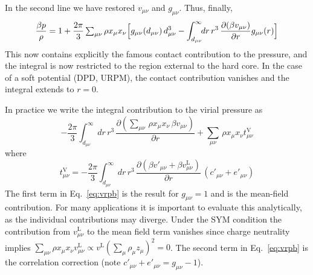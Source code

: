 \documentclass[12pt,a4paper]{article}
\newcommand{\lr}{^{\mathrm{L}}}
\newcommand{\Eqref}[1]{Eq.~\eqref{#1}}
\begin{document}
%
In the second line we have restored $v_{\mu\nu}$ and $g_{\mu\nu}$. 
Thus, finally,
%
\begin{equation}
\frac{\beta p}{\rho}=1
+\frac{2\pi}{3}\,{\textstyle \sum_{\mu\nu}}\,\rho x_\mu x_\nu 
\Bigl[g_{\mu\nu}(d_{\mu\nu})\,d_{\mu\nu}^3 
- \int_{d_{\mu\nu}}^\infty\!\!dr\,r^3\,\frac{\partial(\beta
  v_{\mu\nu})}{\partial r} g_{\mu\nu}(r)\Bigr]
\end{equation}
%
This now contains explicitly the famous contact contribution to the
pressure, and the integral is now restricted to the region external to
the hard core.  In the case of a soft potential (DPD, URPM), the
contact contribution vanishes and the integral extends to $r=0$.

In practice we write the integral contribution to the virial pressure as
%
\begin{equation}
-\frac{2\pi}{3}\int_{d_{\mu\nu}}^\infty\!\!dr\,r^3\,
\frac{\partial({\textstyle \sum_{\mu\nu}}\,
\rho x_\mu x_\nu\,\beta
  v_{\mu\nu})}{\partial r}
+{\textstyle \sum_{\mu\nu}}\,
\rho x_\mu x_\nu t^{\mathrm{V}}_{\mu\nu}
\label{eq:vrpb}
\end{equation}
%
where 
%
\begin{equation}
t^{\mathrm{V}}_{\mu\nu}=-\frac{2\pi}{3}\int_{d_{\mu\nu}}^\infty\!\!dr\,r^3\,
\frac{\partial(\beta v'_{\mu\nu}+\beta v_{\mu\nu}\lr)}{\partial r} 
\,(c'_{\mu\nu}+e'_{\mu\nu})
\end{equation}
%
The first term in \Eqref{eq:vrpb} is the result for $g_{\mu\nu}=1$ and
is the mean-field contribution.  For many applications it is important
to evaluate this analytically, as the individual contributions may
diverge.  Under the SYM condition the contribution from
$v_{\mu\nu}\lr$ to the mean field term vanishes since charge
neutrality implies $\sum_{\mu\nu}\rho x_\mu x_\nu v_{\mu\nu}\lr
\propto v\lr(\sum_\mu \rho_\mu z_\mu)^2 = 0$.  The second term in
\Eqref{eq:vrpb} is the correlation correction (note
$c'_{\mu\nu}+e'_{\mu\nu}=g_{\mu\nu}-1$).
\end{document}

